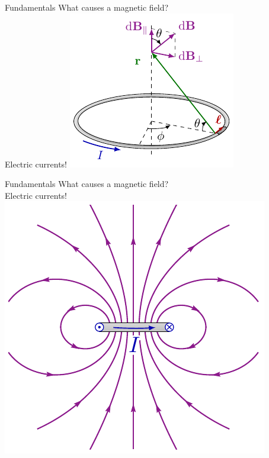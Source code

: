 \begin{frame}
  \begin{PointSix}{Fundamentals}
    What causes a magnetic field? 
    \\
    \alert{Electric currents!}
    \includegraphics[width=0.8\linewidth]{Figures/Magnetics/DipoleCurrentLoop1.pdf}
  \end{PointSix}
\end{frame}

\begin{frame}
  \begin{PointSix}{Fundamentals}
    What causes a magnetic field? 
    \\
    \alert{Electric currents!}
    \includegraphics[width=0.8\linewidth]{Figures/Magnetics/DipoleCurrentLoopSide.pdf}
  \end{PointSix}
\end{frame}

